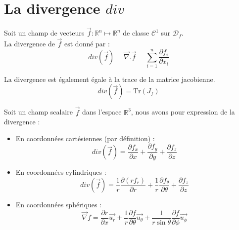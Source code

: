 \section{La divergence $div$}
\begin{defi}
Soit un champ de vecteurs $\overrightarrow{f}:\mathbb{R}^n\mapsto\mathbb{R}^n$ de classe $\mathscr{C}^1$ sur $\mathscr{D}_f$.\\
La divergence de $\overrightarrow{f}$ est donné par :
$$div(\overrightarrow{f})=\overrightarrow{\nabla}.\overrightarrow{f}=\sum_{i=1}^n \frac{\partial f_i}{\partial x_i}$$
\end{defi}
\begin{rmq}
La divergence est également égale à la trace de la matrice jacobienne.
$$div(\overrightarrow{f})=\text{Tr}(J_f)$$
\end{rmq}
\begin{prop}
Soit un champ scalaire $\overrightarrow{f}$ dans l'espace $\mathbb{R}^3$, nous avons pour expression de la divergence :
\begin{itemize}
    \item En coordonnées cartésiennes (par définition) : $$div(\overrightarrow{f})=\frac{\partial f_x}{\partial x}+\frac{\partial f_y}{\partial y}+\frac{\partial f_z}{\partial z}$$
    \item En coordonnées cylindriques : $$div(\overrightarrow{f})=\frac{1}{r}\frac{\partial (r f_r)}{\partial r}+\frac{1}{r}\frac{\partial f_{\theta}}{\partial \theta}+\frac{\partial f_z}{\partial z}$$
    \item En coordonnées sphériques : $$\overrightarrow{\nabla}f=\frac{\partial r}{\partial x}\overrightarrow{u_r}+\frac{1}{r}\frac{\partial f}{\partial \theta}\overrightarrow{u_\theta}+\frac{1}{r\sin{\theta}}\frac{\partial f}{\partial \phi}\overrightarrow{u_\phi}$$
\end{itemize}
\end{prop}
\begin{thm}

\end{thm}
